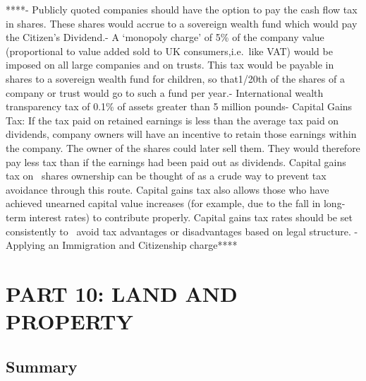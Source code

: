 \documentclass[]{tufte-handout}
\begin{document}
****- Publicly quoted companies should have the option to pay the cash
flow tax in shares. These shares would accrue to a sovereign wealth fund
which would pay the Citizen's Dividend.- A `monopoly charge' of 5\% of
the company value (proportional to value added sold to UK
consumers,i.e.~like VAT) would be imposed on all large companies and on
trusts. This tax would be payable in shares to a sovereign wealth fund
for children, so that1/20th of the shares of a company or trust would go
to such a fund per year.- International wealth transparency tax of 0.1\%
of assets greater than 5 million pounds- Capital Gains Tax: If the tax
paid on retained earnings is less than the average tax paid on
dividends, company owners will have an incentive to retain those
earnings within the company. The owner of the shares could later sell
them. They would therefore pay less tax than if the earnings had been
paid out as dividends. Capital gains tax on ~shares ownership can be
thought of as a crude way to prevent tax avoidance through this route.
Capital gains tax also allows those who have achieved unearned capital
value increases (for example, due to the fall in long-term interest
rates) to contribute properly. Capital gains tax rates should be set
consistently to ~avoid tax advantages or disadvantages based on legal
structure. - Applying an Immigration and Citizenship charge****

\newpage

\hypertarget{part-10-land-and-property}{%
\section{PART 10: LAND AND PROPERTY}\label{part-10-land-and-property}}

\hypertarget{summary-4}{%
\subsection{Summary}\label{summary-4}}
\end{document}
